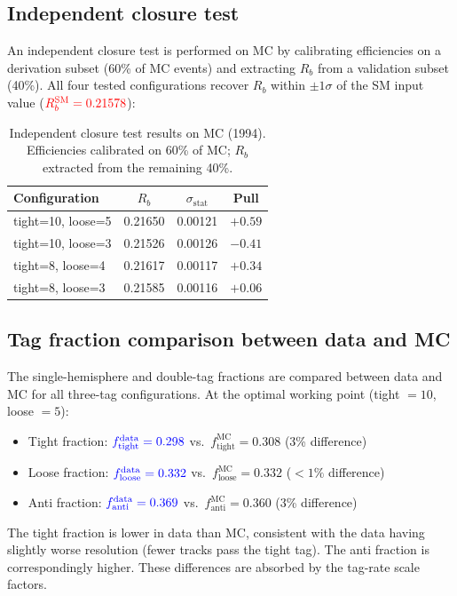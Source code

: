 \documentclass[11pt,a4paper]{article}
\newcommand{\measured}[1]{\textcolor{blue}{#1}}
\newcommand{\external}[1]{\textcolor{red}{#1}}
\begin{document}
\subsection{Independent closure test}
\label{sec:xcheck-closure}

An independent closure test is performed on MC by calibrating
efficiencies on a derivation subset (60\% of MC events) and
extracting $R_b$ from a validation subset (40\%).
All four tested configurations recover $R_b$ within
$\pm 1\sigma$ of the SM input value
($\external{R_b^\text{SM} = 0.21578}$):
\begin{table}[htbp]
\centering
\caption{Independent closure test results on MC (1994).
Efficiencies calibrated on 60\% of MC; $R_b$ extracted from the
remaining 40\%.}
\label{tbl:closure}
\begin{tabular}{lccc}
\toprule
Configuration & $R_b$ & $\sigma_\text{stat}$ & Pull \\
\midrule
tight=10, loose=5 & 0.21650 & 0.00121 & $+0.59$ \\
tight=10, loose=3 & 0.21526 & 0.00126 & $-0.41$ \\
tight=8, loose=4  & 0.21617 & 0.00117 & $+0.34$ \\
tight=8, loose=3  & 0.21585 & 0.00116 & $+0.06$ \\
\bottomrule
\end{tabular}
\end{table}

\subsection{Tag fraction comparison between data and MC}
\label{sec:xcheck-tagfrac}

The single-hemisphere and double-tag fractions are compared between
data and MC for all three-tag configurations.
At the optimal working point (tight $= 10$, loose $= 5$):
\begin{itemize}
\item Tight fraction: $\measured{f_\text{tight}^\text{data} = 0.298}$
  vs.\ $f_\text{tight}^\text{MC} = 0.308$ (3\% difference)
\item Loose fraction: $\measured{f_\text{loose}^\text{data} = 0.332}$
  vs.\ $f_\text{loose}^\text{MC} = 0.332$ ($< 1\%$ difference)
\item Anti fraction: $\measured{f_\text{anti}^\text{data} = 0.369}$
  vs.\ $f_\text{anti}^\text{MC} = 0.360$ (3\% difference)
\end{itemize}
The tight fraction is lower in data than MC, consistent with the
data having slightly worse resolution (fewer tracks pass the tight
tag).
The anti fraction is correspondingly higher.
These differences are absorbed by the tag-rate scale factors.
\end{document}
